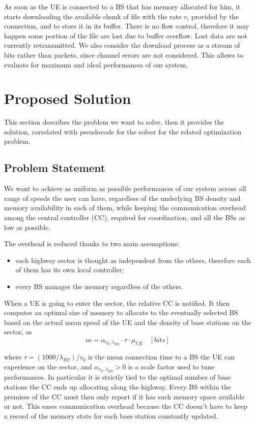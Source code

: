 \documentclass[conference,10pt]{IEEEtran}
\begin{document}
 As soon as the UE is connected to a BS that has memory allocated for him, it starts downloading the available chunk of file with the rate $r_i$ provided by the connection, and to store it in its buffer. There is no flow control, therefore it may happen some portion of the file are lost due to buffer overflow. Lost data are not currently retransmitted. We also consider the download process as a stream of bits rather than packets, since channel errors are not considered. This allows to evaluate for maximum and ideal performances of our system.
 
\section{Proposed Solution}
 
This section describes the problem we want to solve, then it provides the solution, correlated with pseudocode for the solver for the related optimization problem.

\subsection{Problem Statement}

We want to achieve as uniform as possible performances of our system across all range of speeds the user can have, regardless of the underlying BS density and memory availability in each of them, while keeping the communication overhead among the central controller (CC), required for coordination, and all the BSs as low as possible. 

The overhead is reduced thanks to two main assumptions: 
\begin{itemize}
	\item each highway sector is thought as independent from the others, therefore each of them has its own local controller;
	\item every BS manages the memory regardless of the others.
\end{itemize}
When a UE is going to enter the sector, the relative CC is notified. It then computes an optimal size of memory to allocate to the eventually selected BS based on the actual mean speed of the UE and the density of base stations on the sector, as
\begin{equation}
m = \alpha_{v_0, \lambda_{B\!S}} \cdot \tau \cdot \mu_{U\!E} \quad [bits]
\end{equation}

where $\tau = (1000/\lambda_{B\!S})/v_0$ is the mean connection time to a BS the UE can experience on the sector, and $\alpha_{v_0, \lambda_{B\!S}} > 0$ is a scale factor used to tune performances. In particular it is strictly tied to the optimal number of base stations the CC ends up allocating along the highway. Every BS within the premises of the CC must then only report if it has such memory space available or not. This eases communication overhead because the CC doesn't have to keep a record of the memory state for each base station constantly updated.
\end{document}
